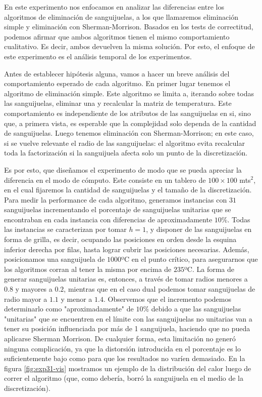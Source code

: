 En este experimento nos enfocamos en analizar las diferencias entre los algoritmos de eliminación de sanguijuelas, a los que llamaremos eliminación simple y eliminación con Sherman-Morrison. Basados en los tests de correctitud, podemos afirmar que ambos algoritmos tienen el mismo comportamiento cualitativo. Es decir, ambos devuelven la misma solución. Por esto, el enfoque de este experimento es el análisis temporal de los experimentos. 

Antes de establecer hipótesis alguna, vamos a hacer un breve análisis del comportamiento esperado de cada algoritmo. En primer lugar tenemos el algoritmo de eliminación simple. Este algoritmo se limita a, iterando sobre todas las sanguijuelas, eliminar una y recalcular la matriz de temperatura. Este comportamiento es independiente de los atributos de las sanguijuelas en si, sino que, a primera vista, es esperable que la complejidad solo dependa de la cantidad de sanguijuelas. Luego tenemos eliminación con Sherman-Morrison; en este caso, si se vuelve relevante el radio de las sanguijuelas: el algoritmo evita recalcular toda la factorización si la sanguijuela afecta solo un punto de la discretización.

Es por esto, que diseñamos el experimento de modo que se pueda apreciar la diferencia en el modo de cómputo. Este consiste en un tablero de $100 \times 100$ mts$^2$, en el cual fijaremos la cantidad de sanguijuelas y el tamaño de la discretización. Para medir la performance de cada algoritmo, generamos instancias con $31$ sanguijuelas incrementando el porcentaje de sanguijuelas unitarias que se encontraban en cada instancia con diferencias de aproximadamente $10\%$. Todas las instancias se caracterizan por tomar $h = 1$, y disponer de las sanguijuelas en forma de grilla, es decir, ocupando las posiciones en orden desde la esquina inferior derecha por filas, hasta lograr cubrir las posiciones necesarias. Además, posicionamos una sanguijuela de $1000$ºC en el punto crítico, para asegurarnos que los algoritmos corran al tener la misma por encima de $235$ºC. La forma de generar sanguijuelas unitarias es, entonces, a través de tomar radios menores a $0.8$ y mayores a $0.2$, mientras que en el caso dual podemos tomar sanguijuelas de radio mayor a $1.1$ y menor a $1.4$. Observemos que el incremento podemos determinarlo como "aproximadamente" de $10\%$ debido a que las sanguijuelas "unitarias" que se encuentren en el límite con las sanguijuelas no unitarias van a tener su posición influenciada por más de 1 sanguijuela, haciendo que no pueda aplicarse Sherman Morrison. De cualquier forma, esta limitación no generó ninguna complicación, ya que la distorsión introducida en el porcentaje es lo suficientemente bajo como para que los resultados no varíen demasiado. En la figura \ref{fig:exp31-vis} mostramos un ejemplo de la distribución del calor luego de correr el algoritmo (que, como debería, borró la sanguijuela en el medio de la discretización).


